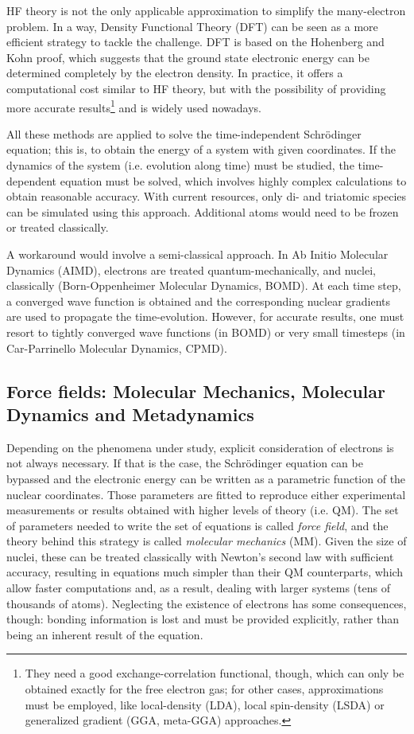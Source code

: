 HF theory is not the only applicable approximation to simplify the many-electron problem. In a way, Density Functional Theory (DFT) can be seen as a more efficient strategy to tackle the challenge. DFT is based on the Hohenberg and Kohn proof, which suggests that the ground state electronic energy can be determined completely by the electron density. In practice, it offers a computational cost similar to HF theory, but with the possibility of providing more accurate results\footnote{They need a good exchange-correlation functional, though, which can only be obtained exactly for the free electron gas; for other cases, approximations must be employed, like local-density (LDA), local spin-density (LSDA) or generalized gradient (GGA, meta-GGA) approaches.} and is widely used nowadays.

All these methods are applied to solve the time-independent Schrödinger equation; this is, to obtain the energy of a system with given coordinates. If the dynamics of the system (i.e. evolution along time) must be studied, the time-dependent equation must be solved, which involves highly complex calculations to obtain reasonable accuracy. With current resources, only di- and triatomic species can be simulated using this approach. Additional atoms would need to be frozen or treated classically.

A workaround would involve a semi-classical approach. In Ab Initio Molecular Dynamics (AIMD), electrons are treated quantum-mechanically, and nuclei, classically (Born-Oppenheimer Molecular Dynamics, BOMD). At each time step, a converged wave function is obtained and the corresponding nuclear gradients are used to propagate the time-evolution. However, for accurate results, one must resort to tightly converged wave functions (in BOMD) or very small timesteps (in Car-Parrinello Molecular Dynamics, CPMD).

\subsection{Force fields: Molecular Mechanics, Molecular Dynamics and Metadynamics}
\label{section:mm-md}
Depending on the phenomena under study, explicit consideration of electrons is not always necessary. If that is the case, the Schrödinger equation can be bypassed and the electronic energy can be written as a parametric function of the nuclear coordinates. Those parameters are fitted to reproduce either experimental measurements or results obtained with higher levels of theory (i.e. QM). The set of parameters needed to write the set of equations is called \textit{force field}, and the theory behind this strategy is called \textit{molecular mechanics} (MM). Given the size of nuclei, these can be treated classically with Newton's second law with sufficient accuracy, resulting in equations much simpler than their QM counterparts, which allow faster computations and, as a result, dealing with larger systems (tens of thousands of atoms). Neglecting the existence of electrons has some consequences, though: bonding information is lost and must be provided explicitly, rather than being an inherent result of the equation.

